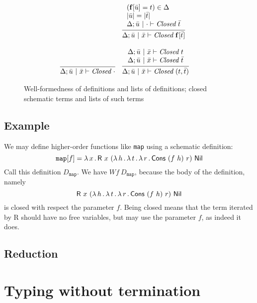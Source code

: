 \documentclass{article}
\begin{document}
\begin{figure}
\[\begin{array}{lll}
   &\infer{\Delta;\bar{u}\ |\ \bar{x}\vdash\textit{Closed}\ \mathbf{f}[\bar{t}]}
        {\begin{array}{l}
             (\mathbf{f}[\bar{u}] = t) \in \Delta \\
            |\bar{u}| = |\bar{t}| \\
           \Delta;\bar{u}\ |\ \cdot \vdash \textit{Closed}\ \bar{t}
         \end{array}} 
\\ \\
\infer{\Delta;\bar{u}\ |\ \bar{x}\vdash \textit{Closed}\ \cdot}{\ }&
\infer{\Delta;\bar{u}\ |\ \bar{x}\vdash \textit{Closed}\ (t,\bar{t})}
  {\begin{array}{l}
    \Delta;\bar{u}\ |\ \bar{x}\vdash \textit{Closed}\ t \\
    \Delta;\bar{u}\ |\ \bar{x}\vdash \textit{Closed}\ \bar{t}
\end{array}}&\ 
   \end{array}
  \]
  \caption{Well-formedness of definitions and lists of definitions; closed schematic terms and lists of such terms}
\label{fig:wf}
\end{figure}

\subsection{Example}

We may define higher-order functions like \texttt{map} using a schematic definition:
\[
\texttt{map}[f] = \lam{x}{\mathsf{R}\ x\ (\lam{h}{\lam{t}{\lam{r}{\mathsf{Cons}\ (f\ h)\ r}}})\ \mathsf{Nil}}
\]
\noindent Call this definition $D_{\texttt{map}}$.  We have $\textit{Wf}\ D_{\texttt{map}}$, because the
body of the definition, namely
\[
\mathsf{R}\ x\ (\lam{h}{\lam{t}{\lam{r}{\mathsf{Cons}\ (f\ h)\ r}}})\ \mathsf{Nil}
\]
\noindent is closed with respect the parameter $f$.  Being closed
means that the term iterated by \textsf{R} should have no free
variables, but may use the parameter $f$, as indeed it does.

\subsection{Reduction}





\section{Typing without termination}

 
\end{document}
